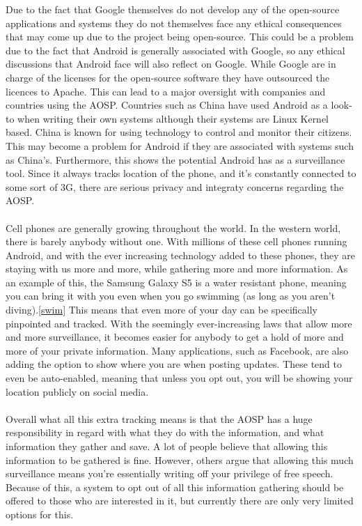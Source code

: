 \documentclass[conference]{IEEEtran}
\begin{document}
Due to the fact that Google themselves do not develop any of the open-source applications and systems they do not themselves face any ethical consequences that may come up due to the project being open-source. This could be a problem due to the fact that Android is generally associated with Google, so any ethical discussions that Android face will also reflect on Google. While Google are in charge of the licenses for the open-source software they have outsourced the licences to Apache.\cite{Android-licenses} This can lead to a major oversight with companies and countries using the AOSP. Countries such as China have used Android as a look-to when writing their own systems\cite{country-license} although their systems are Linux Kernel based. China is known for using technology to control and monitor their citizens. This may become a problem for Android if they are associated with systems such as China's. Furthermore, this shows the potential Android has as a surveillance tool. Since it always tracks location of the phone, and it's constantly connected to some sort of 3G, there are serious privacy and integraty concerns regarding the AOSP. 
\\\\Cell phones are generally growing throughout the world. In the western world, there is barely anybody without one. With millions of these cell phones running Android, and with the ever increasing technology added to these phones, they are staying with us more and more, while gathering more and more information. As an example of this, the Samsung Galaxy S5 is a water resistant phone, meaning you can bring it with you even when you go swimming (as long as you aren't diving).\ref{swim} This means that even more of your day can be specifically pinpointed and tracked. With the seemingly ever-increasing laws that allow more and more surveillance, it becomes easier for anybody to get a hold of more and more of your private information.  Many applications, such as Facebook, are also adding the option to show where you are when posting updates. These tend to even be auto-enabled, meaning that unless you opt out, you will be showing your location publicly on social media. 
\\\\Overall what all this extra tracking means is that the AOSP has a huge responsibility in regard with what they do with the information, and what information they gather and save. A lot of people believe that allowing this information to be gathered is fine. However, others argue that allowing this much surveillance means you're essentially writing off your privilege of free speech. Because of this, a system to opt out of all this information gathering should be offered to those who are interested in it, but currently there are only very limited options for this. 
\end{document}
